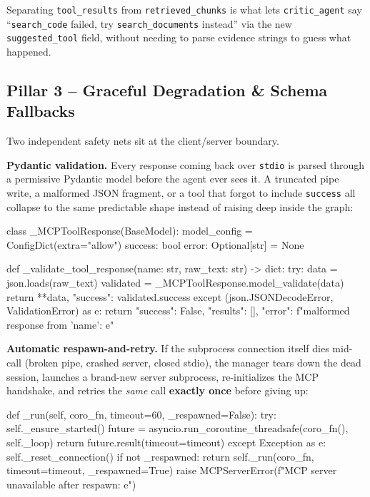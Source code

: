 \documentclass[11pt,a4paper]{article}
\begin{document}
Separating \texttt{tool\_results} from \texttt{retrieved\_chunks} is what
lets \texttt{critic\_agent} say ``\texttt{search\_code} failed, try
\texttt{search\_documents} instead'' via the new \texttt{suggested\_tool}
field, without needing to parse evidence strings to guess what happened.

\subsection{Pillar 3 -- Graceful Degradation \& Schema Fallbacks}

Two independent safety nets sit at the client/server boundary.

\textbf{Pydantic validation.} Every response coming back over
\texttt{stdio} is parsed through a permissive Pydantic model before the
agent ever sees it. A truncated pipe write, a malformed JSON fragment, or
a tool that forgot to include \texttt{success} all collapse to the same
predictable shape instead of raising deep inside the graph:

\begin{pycode}
class _MCPToolResponse(BaseModel):
    model_config = ConfigDict(extra="allow")
    success: bool
    error: Optional[str] = None

def _validate_tool_response(name: str, raw_text: str) -> dict:
    try:
        data = json.loads(raw_text)
        validated = _MCPToolResponse.model_validate(data)
        return {**data, "success": validated.success}
    except (json.JSONDecodeError, ValidationError) as e:
        return {"success": False, "results": [],
                 "error": f"malformed response from '{name}': {e}"}
\end{pycode}

\textbf{Automatic respawn-and-retry.} If the subprocess connection itself
dies mid-call (broken pipe, crashed server, closed stdio), the manager
tears down the dead session, launches a brand-new server subprocess,
re-initializes the MCP handshake, and retries the \emph{same} call
\textbf{exactly once} before giving up:

\begin{pycode}
def _run(self, coro_fn, timeout=60, _respawned=False):
    try:
        self._ensure_started()
        future = asyncio.run_coroutine_threadsafe(coro_fn(), self._loop)
        return future.result(timeout=timeout)
    except Exception as e:
        self._reset_connection()
        if not _respawned:
            return self._run(coro_fn, timeout=timeout, _respawned=True)
        raise MCPServerError(f"MCP server unavailable after respawn: {e}")
\end{pycode}
\end{document}
